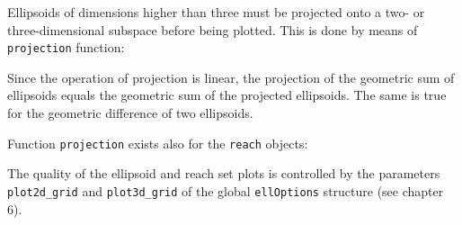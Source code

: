 Ellipsoids of dimensions higher than three must be
projected onto a two- or three-dimensional subspace before being plotted.
This is done by means of {\tt projection} function:

Since the operation of projection is linear, the projection of the geometric
sum of ellipsoids equals the geometric sum of the projected ellipsoids.
The same is true for the geometric difference of two ellipsoids.

Function {\tt projection} exists also for the {\tt reach} objects:

The quality of the ellipsoid and reach set plots is controlled by the
parameters {\tt plot2d\_grid} and {\tt plot3d\_grid} of the global
{\tt ellOptions} structure (see chapter 6).